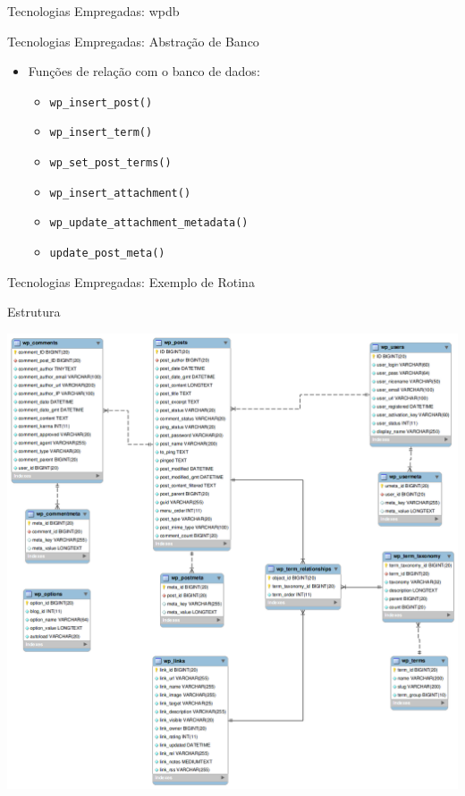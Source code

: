 \documentclass[handout]{beamer}
\begin{document}
\begin{frame}{Tecnologias Empregadas: wpdb}
  
\end{frame}

\begin{frame}{Tecnologias Empregadas: Abstração de Banco}
    \begin{itemize}
    \pause \item Funções de relação com o banco de dados:
    \begin{itemize}
      \pause \item \texttt{wp\_insert\_post()}
      \pause \item \texttt{wp\_insert\_term()}
      \pause \item \texttt{wp\_set\_post\_terms()}
      \pause \item \texttt{wp\_insert\_attachment()}
      \pause \item \texttt{wp\_update\_attachment\_metadata()}
      \pause \item \texttt{update\_post\_meta()}
    \end{itemize}
  \end{itemize}
\end{frame}

\begin{frame}{Tecnologias Empregadas: Exemplo de Rotina}
  
\end{frame}

\begin{frame}{Estrutura}
  \begin{center}
    \pause \includegraphics[height=0.8\textheight,natwidth=1079,natheight=1089]{./img/wp-tables.png}
  \end{center}
\end{frame}
\end{document}
